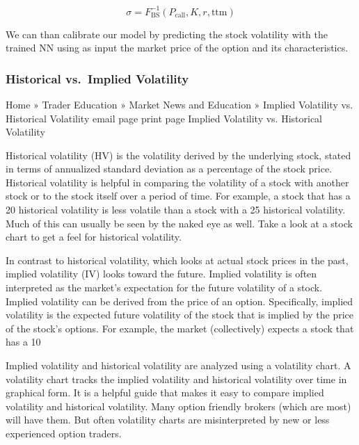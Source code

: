 \[ \sigma = F^{-1}_\textrm{BS}(P_\textrm{call}, K, r, \mathrm{ttm})\]

We can than calibrate our model by predicting the stock volatility with
the trained NN using as input the market price of the option and its
characteristics.

\subsubsection{Historical vs.~Implied
		Volatility}\label{historical-vs.-implied-volatility}


Home » Trader Education » Market News and Education » Implied Volatility vs. Historical Volatility
email page
print page
Implied Volatility vs. Historical Volatility

Historical volatility (HV) is the volatility derived by the underlying stock, stated in terms of annualized standard deviation as a percentage of the stock price. Historical volatility is helpful in comparing the volatility of a stock with another stock or to the stock itself over a period of time. For example, a stock that has a 20 historical volatility is less volatile than a stock with a 25 historical volatility. Much of this can usually be seen by the naked eye as well. Take a look at a stock chart to get a feel for historical volatility.

In contrast to historical volatility, which looks at actual stock prices in the past, implied volatility (IV) looks toward the future. Implied volatility is often interpreted as the market's expectation for the future volatility of a stock. Implied volatility can be derived from the price of an option. Specifically, implied volatility is the expected future volatility of the stock that is implied by the price of the stock's options. For example, the market (collectively) expects a stock that has a 10%

Implied volatility and historical volatility are analyzed using a volatility chart. A volatility chart tracks the implied volatility and historical volatility over time in graphical form. It is a helpful guide that makes it easy to compare implied volatility and historical volatility. Many option friendly brokers (which are most) will have them. But often volatility charts are misinterpreted by new or less experienced option traders.

